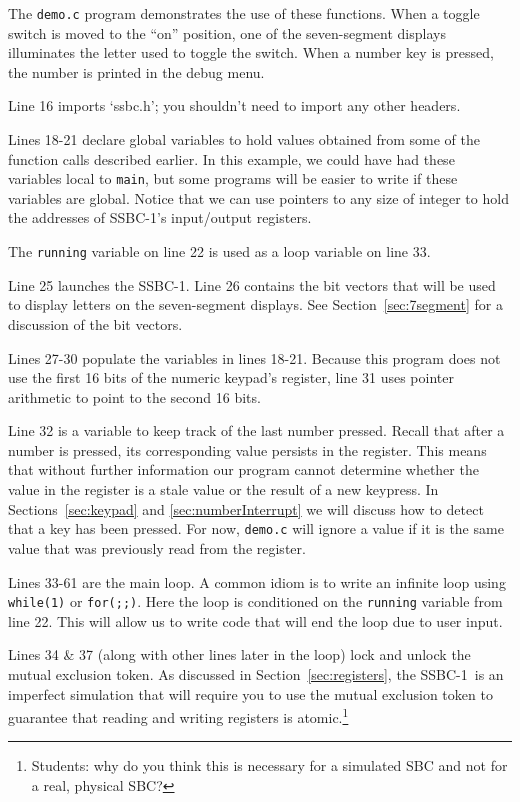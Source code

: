 \documentclass[12pt]{article}
\newcommand{\SSBC}{SSBC-1}
\begin{document}
The \texttt{demo.c} program demonstrates the use of these functions. When a
toggle switch is moved to the ``on'' position, one of the seven-segment
displays illuminates the letter used to toggle the switch. When a number key is
pressed, the number is printed in the debug menu.



Line 16 imports `ssbc.h'; you shouldn't need to import any other headers.

Lines 18-21 declare global variables to hold values obtained from some of the
function calls described earlier. In this example, we could have had these
variables local to \texttt{main}, but some programs will be easier to write if
these variables are global. Notice that we can use pointers to any size of
integer to hold the addresses of \SSBC's input/output registers.

The \texttt{running} variable on line 22 is used as a loop variable on line 33.

Line 25 launches the \SSBC. Line 26 contains the bit vectors that will be used
to display letters on the seven-segment displays. See
Section~\ref{sec:7segment} for a discussion of the bit vectors.

Lines 27-30 populate the variables in lines 18-21. Because this program does not
use the first 16 bits of the numeric keypad's register, line 31 uses pointer
arithmetic to point to the second 16 bits.

Line 32 is a variable to keep track of the last number pressed. Recall that
after a number is pressed, its corresponding value persists in the register.
This means that without further information our program cannot determine
whether the value in the register is a stale value or the result of a new
keypress. In Sections~\ref{sec:keypad} and \ref{sec:numberInterrupt} we will
discuss how to detect that a key has been pressed. For now, \texttt{demo.c}
will ignore a value if it is the same value that was previously read from the
register.

Lines 33-61 are the main loop. A common idiom is to write an infinite loop
using \texttt{while(1)} or \texttt{for(;;)}. Here the loop is conditioned on
the \texttt{running} variable from line 22. This will allow us to write code
that will end the loop due to user input.

Lines 34 \& 37 (along with other lines later in the loop) lock and unlock the
mutual exclusion token. As discussed in Section~\ref{sec:registers}, the \SSBC\
is an imperfect simulation that will require you to use the mutual exclusion
token to guarantee that reading and writing registers is
atomic.\footnote{Students: why do you think this is necessary for a simulated
SBC and not for a real, physical SBC?}
\end{document}
